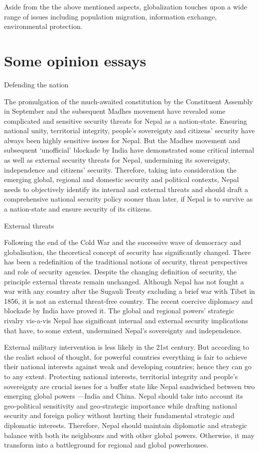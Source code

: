 \documentclass[
  openany]{book}
\begin{document}
Aside from the the above mentioned aspects, globalization touches upon a wide range of issues including population migration, information exchange, environmental protection.

\hypertarget{some-opinion-essays}{%
\section{Some opinion essays}\label{some-opinion-essays}}

Defending the nation

The promulgation of the much-awaited constitution by the Constituent Assembly in September and the subsequent Madhes movement have revealed some complicated and sensitive security threats for Nepal as a nation-state. Ensuring national unity, territorial integrity, people's sovereignty and citizens' security have always been highly sensitive issues for Nepal. But the Madhes movement and subsequent `unofficial' blockade by India have demonstrated some critical internal as well as external security threats for Nepal, undermining its sovereignty, independence and citizens' security. Therefore, taking into consideration the emerging global, regional and domestic security and political contexts, Nepal needs to objectively identify its internal and external threats and should draft a comprehensive national security policy sooner than later, if Nepal is to survive as a nation-state and ensure security of its citizens.

External threats

Following the end of the Cold War and the successive wave of democracy and globalisation, the theoretical concept of security has significantly changed. There has been a redefinition of the traditional notions of security, threat perspectives and role of security agencies. Despite the changing definition of security, the principle external threats remain unchanged. Although Nepal has not fought a war with any country after the Sugauli Treaty excluding a brief war with Tibet in 1856, it is not an external threat-free country. The recent coercive diplomacy and blockade by India have proved it. The global and regional powers' strategic rivalry vis-a-vis Nepal has significant internal and external security implications that have, to some extent, undermined Nepal's sovereignty and independence.

External military intervention is less likely in the 21st century. But according to the realist school of thought, for powerful countries everything is fair to achieve their national interests against weak and developing countries; hence they can go to any extent. Protecting national interests, territorial integrity and people's sovereignty are crucial issues for a buffer state like Nepal sandwiched between two emerging global powers ---India and China. Nepal should take into account its geo-political sensitivity and geo-strategic importance while drafting national security and foreign policy without hurting their fundamental strategic and diplomatic interests. Therefore, Nepal should maintain diplomatic and strategic balance with both its neighbours and with other global powers. Otherwise, it may transform into a battleground for regional and global powerhouses.
\end{document}
